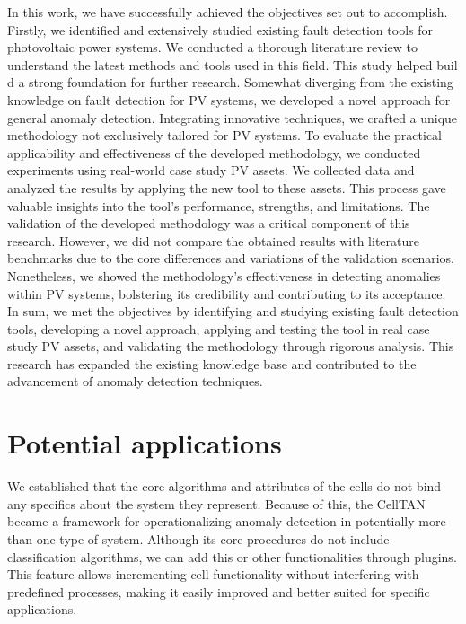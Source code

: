 In this work, we have successfully achieved the objectives set out to accomplish. Firstly, we identified and extensively studied existing fault detection tools for photovoltaic power systems. We conducted a thorough literature review to understand the latest methods and tools used in this field. This study helped buil d a strong foundation for further research.
Somewhat diverging from the existing knowledge on fault detection for PV systems, we developed a novel approach for general anomaly detection. Integrating innovative techniques, we crafted a unique methodology not exclusively tailored for PV systems.
To evaluate the practical applicability and effectiveness of the developed methodology, we conducted experiments using real-world case study PV assets. We collected data and analyzed the results by applying the new tool to these assets. This process gave valuable insights into the tool's performance, strengths, and limitations. The validation of the developed methodology was a critical component of this research. However, we did not compare the obtained results with literature benchmarks due to the core differences and variations of the validation scenarios. Nonetheless, we showed the methodology's effectiveness in detecting anomalies within PV systems, bolstering its credibility and contributing to its acceptance.
In sum, we met the objectives by identifying and studying existing fault detection tools, developing a novel approach, applying and testing the tool in real case study PV assets, and validating the methodology through rigorous analysis. This research has expanded the existing knowledge base and contributed to the advancement of anomaly detection techniques.

\section{Potential applications}


We established that the core algorithms and attributes of the cells do not bind any specifics about the system they represent. Because of this, the CellTAN became a framework for operationalizing anomaly detection in potentially more than one type of system. Although its core procedures do not include classification algorithms, we can add this or other functionalities through plugins. This feature allows incrementing cell functionality without interfering with predefined processes, making it easily improved and better suited for specific applications.

